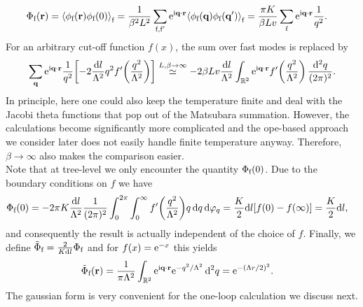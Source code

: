 \begin{align*}
\Phi_\f(\textbf{r}) &= \bra*{\phi_\f(\textbf{r}) \phi_\f(0)}_\f = \frac{1}{\beta^2 L^2} \sum_{\f,\f'} \powe{\i \textbf{q} \cdot \textbf{r}} \bra*{\phi_\f(\textbf{q}) \phi_\f(\textbf{q}')}_\f = \frac{\pi K}{\beta L v} \sum_\f \powe{\i \textbf{q}\cdot\textbf{r}} \frac{1}{q^2}.
\end{align*}
For an arbitrary cut-off function $f(x)$, the sum over fast modes is replaced by
\begin{align*}
\sum_\textbf{q} \powe{\i \textbf{q} \cdot \textbf{r}} \frac{1}{q^2} \klb*{-2 \frac{\d l}{\Lambda^2} q^2 f'\kla*{\frac{q^2}{\Lambda^2}}} \asymeq{L,\beta \rightarrow\infty} - 2\beta Lv \frac{\d l}{\Lambda^2} \intrndpi{2}{\powe{\i \textbf{q} \cdot \textbf{r}} f'\kla*{\frac{q^2}{\Lambda^2}}}{q}.
\end{align*}
In principle, here one could also keep the temperature finite and deal with the Jacobi theta functions that pop out of the Matsubara summation.
However, the calculations become significantly more complicated and the \acrshort{ope}-based approach we consider later does not easily handle finite temperature anyway.
Therefore, $\beta\rightarrow \infty$ also makes the comparison easier.\\
Note that at tree-level we only encounter the quantity $\Phi_\f(0)$.
Due to the boundary conditions on $f$ we have
\begin{align*}
\Phi_\f(0) &= -2\pi K \frac{\d l}{\Lambda^2} \frac{1}{(2\pi)^2} \intx{0}{2\pi}{\intx{0}{\infty}{ f'\kla*{\frac{q^2}{\Lambda^2}} q }{q}}{\varphi_q} = \frac{K}{2} \d l \klb*{f(0) - f(\infty)} = \frac{K}{2} \d l,
\end{align*}
and consequently the result is actually independent of the choice of $f$.
Finally, we define $\tilde{\Phi}_\f = \frac{2}{K \d l} \Phi_\f$ and for $f(x) = \powe{-x}$ this yields
\begin{align*}
\tilde{\Phi}_\f(\textbf{r}) &= \frac{1}{\pi \Lambda^2} \intrnd{2}{\powe{\i \textbf{q}\cdot \textbf{r}} \powe{- q^2/\Lambda^2}}{q} = \powe{-\kla*{\Lambda r/2}^2}.
\end{align*}
The gaussian form is very convenient for the one-loop calculation we discuss next.
